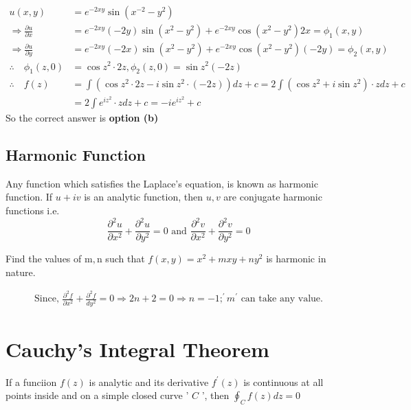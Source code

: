 	\begin{answer}
		\begin{align*}
		u(x, y)&=e^{-2 x y} \sin \left(x^{-2}-y^{2}\right) \\
		\Rightarrow \frac{\partial u}{\partial x}&=e^{-2 x y}(-2 y) \sin \left(x^{2}-y^{2}\right)+e^{-2 x y} \cos \left(x^{2}-y^{2}\right) 2 x=\phi_{1}(x, y) \\
		\Rightarrow \frac{\partial u}{\partial y}&=e^{-2 x y}(-2 x) \sin \left(x^{2}-y^{2}\right)+e^{-2 x y} \cos \left(x^{2}-y^{2}\right)(-2 y)=\phi_{2}(x, y)\\
		\therefore \quad \phi_{1}(z, 0) &=\cos z^{2} \cdot 2 z, \phi_{2}(z, 0)=\sin z^{2}(-2 z) \\
		\therefore \quad f(z) &=\int\left(\cos z^{2} \cdot 2 z-i \sin z^{2} \cdot(-2 z)\right) d z+c=2 \int\left(\cos z^{2}+i \sin z^{2}\right) \cdot z d z+c \\
		&=2 \int e^{i z^{2}} \cdot z d z+c=-i e^{i z^{2}}+c
		\end{align*}
		So the correct answer is \textbf{option (b)}
	\end{answer}
\subsection{Harmonic Function}
Any function which satisfies the Laplace's equation, is known as harmonic function. If $u+i v$ is an analytic function, then $u, v$ are conjugate harmonic functions i.e.
$$
\frac{\partial^{2} u}{\partial x^{2}}+\frac{\partial^{2} u}{\partial y^{2}}=0 \text { and } \frac{\partial^{2} v}{\partial x^{2}}+\frac{\partial^{2} v}{\partial y^{2}}=0
$$
\begin{exercise}
	Find the values of $\mathrm{m}, \mathrm{n}$ such that $f(x, y)=x^{2}+m x y+n y^{2}$ is harmonic in nature.
\end{exercise}
\begin{answer}
	\begin{align*}
	\text { Since, } \frac{\partial^{2} f}{\partial x^{2}}+\frac{\partial^{2} f}{d y^{2}}=0 \Rightarrow 2 n+2=0 \Rightarrow n=-1 ;^{\prime} m^{\prime} \text { can take any value. }
	\end{align*}
\end{answer}
\section{Cauchy's Integral Theorem}
If a funciion $f(z)$ is analytic and its derivative $f^{\prime}(z)$ is continuous at all points inside and on a simple closed curve ' $C$ ', then $\oint_{C} f(z) d z=0$\\
